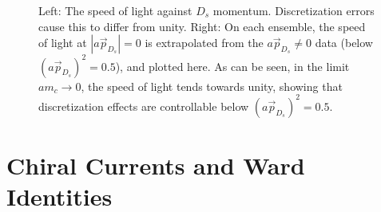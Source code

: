 \begin{figure}
\begin{subfigure}{.5\textwidth}
  \label{fig:sub2}
\end{subfigure}
\caption{Left: The speed of light against $D_s$ momentum. Discretization errors cause this to differ from unity. Right: On each ensemble, the speed of light at $\left\vert a\vec{p}_{D_s} \right\vert=0$ is extrapolated from the $a\vec{p}_{D_s}\neq 0$ data (below $\left(a\vec{p}_{D_s}\right)^2 =0.5$), and plotted here. As can be seen, in the limit $am_c\to 0$, the speed of light tends towards unity, showing that discretization effects are controllable below $\left(a\vec{p}_{D_s}\right)^2 = 0.5$.}
\label{fig:speedoflight}
\end{figure}





\appendix


\section{Chiral Currents and Ward Identities}
\label{sec:ward}

